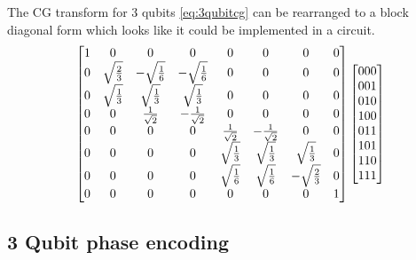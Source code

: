 The CG transform for 3 qubits \autoref{eq:3qubitcg} can be rearranged to a block diagonal form which looks like it could be implemented in a circuit.
\begin{align}
\begin{bmatrix}
1 &0 &0 &0 &0 &0 &0 &0 \\
0 &\sqrt{\frac{2}{3}} &-\sqrt{\frac{1}{6}} &-\sqrt{\frac{1}{6}} &0 &0 &0 &0\\
0 &\sqrt{\frac{1}{3}} &\sqrt{\frac{1}{3}} &\sqrt{\frac{1}{3}} &0 &0 &0 &0\\
0 &0 &\frac{1}{\sqrt{2}} &-\frac{1}{\sqrt{2}} &0 &0 &0 &0 \\
0 &0 &0 &0 &\frac{1}{\sqrt{2}} &-\frac{1}{\sqrt{2}} &0 &0 \\
0 &0 &0 &0 &\sqrt{\frac{1}{3}} &\sqrt{\frac{1}{3}} &\sqrt{\frac{1}{3}} &0 \\
0 &0 &0 &0 &\sqrt{\frac{1}{6}} &\sqrt{\frac{1}{6}} &-\sqrt{\frac{2}{3}} &0 \\
0 &0 &0 &0 &0 &0 &0 &1 \\
\end{bmatrix}
\begin{bmatrix}
000 \\
001 \\
010 \\
100 \\
011 \\
101 \\
110 \\
111 \\
\end{bmatrix}
\end{align}

\subsection{3 Qubit phase encoding}

